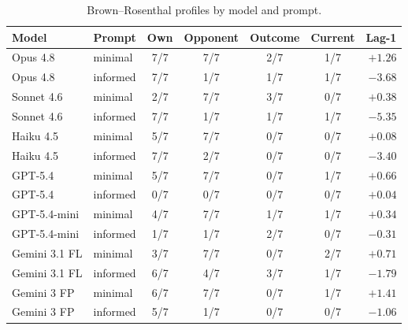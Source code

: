 \begin{table}[t]
\centering
\caption{Brown--Rosenthal profiles by model and prompt.}
\label{tab:brown-rosenthal}
\begin{tabular}{llccccr}
\toprule
Model & Prompt & Own & Opponent & Outcome & Current & Lag-1 \\
\midrule
Opus 4.8 & minimal & 7/7 & 7/7 & 2/7 & 1/7 & $+1.26$ \\
Opus 4.8 & informed & 7/7 & 1/7 & 1/7 & 1/7 & $-3.68$ \\
Sonnet 4.6 & minimal & 2/7 & 7/7 & 3/7 & 0/7 & $+0.38$ \\
Sonnet 4.6 & informed & 7/7 & 1/7 & 1/7 & 1/7 & $-5.35$ \\
Haiku 4.5 & minimal & 5/7 & 7/7 & 0/7 & 0/7 & $+0.08$ \\
Haiku 4.5 & informed & 7/7 & 2/7 & 0/7 & 0/7 & $-3.40$ \\
GPT-5.4 & minimal & 5/7 & 7/7 & 0/7 & 1/7 & $+0.66$ \\
GPT-5.4 & informed & 0/7 & 0/7 & 0/7 & 0/7 & $+0.04$ \\
GPT-5.4-mini & minimal & 4/7 & 7/7 & 1/7 & 1/7 & $+0.34$ \\
GPT-5.4-mini & informed & 1/7 & 1/7 & 2/7 & 0/7 & $-0.31$ \\
Gemini 3.1 FL & minimal & 3/7 & 7/7 & 0/7 & 2/7 & $+0.71$ \\
Gemini 3.1 FL & informed & 6/7 & 4/7 & 3/7 & 1/7 & $-1.79$ \\
Gemini 3 FP & minimal & 6/7 & 7/7 & 0/7 & 1/7 & $+1.41$ \\
Gemini 3 FP & informed & 5/7 & 1/7 & 0/7 & 0/7 & $-1.06$ \\
\bottomrule
\end{tabular}
\end{table}
